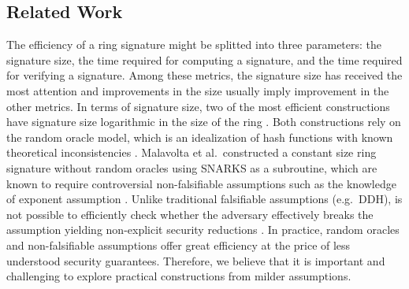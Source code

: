 \subsection{Related Work}
The efficiency of a ring signature might be splitted into three parameters: the signature size, the time required for computing a signature, and the time required for verifying a signature. Among these metrics, the signature size has received the most attention and improvements in the size usually imply improvement in the other metrics.
In terms of signature size, two of the most efficient constructions have signature size logarithmic in the size of the ring \cite{EC:GroKoh15,EC:LLNW16}. Both constructions rely on the {random oracle model}, which is an idealization of hash functions with known theoretical inconsistencies \cite{FOCS:GolKal03}. Malavolta et al.~constructed a constant size ring signature without random oracles \cite{AC:MalSch17} using SNARKS \cite{EC:GGPR13,AC:DFGK14,EC:Groth16} as a subroutine, which are known to require controversial non-falsifiable assumptions such as the knowledge of exponent assumption  \cite{STOC:GenWic11,C:Naor03}. Unlike traditional falsifiable assumptions (e.g.~DDH), is not possible to efficiently check whether the adversary effectively breaks the assumption yielding non-explicit security reductions \cite{C:Naor03}. In practice, random oracles and non-falsifiable assumptions offer great efficiency at the price of less understood security guarantees. Therefore, we believe that it is  important and challenging to explore practical constructions from milder assumptions.

